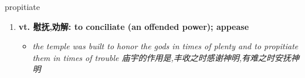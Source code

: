 
\begin{frame}
{\huge propitiate}
\begin{center}
\begin{enumerate}\Large
  \item \textbf{vt. 慰抚,劝解: to conciliate (an offended power); appease}
  \begin{itemize}
    \item \em{\Large{the temple was built to honor the gods in times of plenty and to propitiate them in times of trouble 庙宇的作用是,丰收之时感谢神明,有难之时安抚神明}}
  \end{itemize}
\end{enumerate}
\end{center}
\end{frame}
